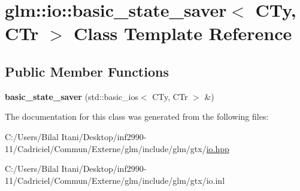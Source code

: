 \hypertarget{classglm_1_1io_1_1basic__state__saver}{}\section{glm\+:\+:io\+:\+:basic\+\_\+state\+\_\+saver$<$ C\+Ty, C\+Tr $>$ Class Template Reference}
\label{classglm_1_1io_1_1basic__state__saver}
\subsection*{Public Member Functions}
\begin{DoxyCompactItemize}
\item 
{\bfseries basic\+\_\+state\+\_\+saver} (std\+::basic\+\_\+ios$<$ C\+Ty, C\+Tr $>$ \&)\hypertarget{classglm_1_1io_1_1basic__state__saver_ab31652b0b7f2a24fa8f9fda2505de356}{}\label{classglm_1_1io_1_1basic__state__saver_ab31652b0b7f2a24fa8f9fda2505de356}

\end{DoxyCompactItemize}


The documentation for this class was generated from the following files\+:\begin{DoxyCompactItemize}
\item 
C\+:/\+Users/\+Bilal Itani/\+Desktop/inf2990-\/11/\+Cadriciel/\+Commun/\+Externe/glm/include/glm/gtx/\hyperlink{io_8hpp}{io.\+hpp}\item 
C\+:/\+Users/\+Bilal Itani/\+Desktop/inf2990-\/11/\+Cadriciel/\+Commun/\+Externe/glm/include/glm/gtx/io.\+inl\end{DoxyCompactItemize}
